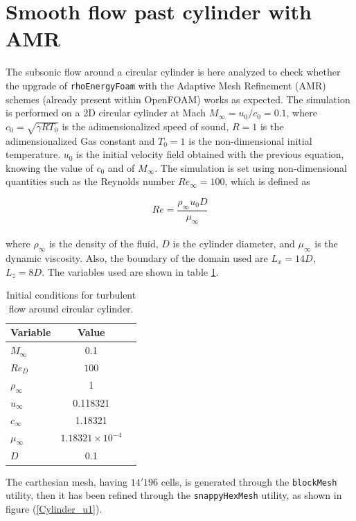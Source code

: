\documentclass[a5paper]{sapthesis}
\begin{document}
	\section{Smooth flow past cylinder with AMR}
	\label{AMR_cylinder}
	
	The subsonic flow around a circular cylinder is here analyzed to check whether the upgrade of \texttt{rhoEnergyFoam} with the Adaptive Mesh Refinement (AMR) schemes (already present within OpenFOAM) works as expected. The simulation is performed on a 2D  circular cylinder at Mach $M_\infty = u_0/c_0 = 0.1$, where $c_0 = \sqrt{\gamma R T_0}$ is the adimensionalized speed of sound, $R = 1$ is the adimensionalized Gas constant and $T_0 =1$ is the non-dimensional initial temperature. $u_0$ is the initial velocity field obtained with the previous equation, knowing the value of $c_0$ and of $M_\infty$. The simulation is set using non-dimensional quantities such as the Reynolds number $Re_\infty = 100$, which is defined as 
	
	\begin{equation}
		Re = \frac{\rho_\infty u_0 D}{\mu_\infty}
	\end{equation}
	\\
	where $\rho_\infty$ is the density of the fluid, $D$ is the cylinder diameter, and $\mu_\infty$ is the dynamic viscosity. Also, the boundary of the domain used are $L_x = 14D$, $L_z = 8D$. 
	The variables used are shown in table \ref{tab:cylinder_2d}.
	
	\begin{table}[h]
		\centering
		\begin{tabular}{lcc}
			\hline
			Variable & Value \\
			\hline
			$M_{\infty}$ & 0.1 \\
			$Re_{D}$ & $100$ \\
			$\rho_{\infty}$ & 1 \\
			$u_{\infty}$ & 0.118321 \\
			$c_{\infty}$ & 1.18321 \\
			$\mu_{\infty}$ & $1.18321 \times 10^{-4}$ \\
			$D$ & 0.1 \\
			\hline
		\end{tabular}
		\vspace{3mm}
		\caption{Initial conditions for turbulent flow around 
			circular cylinder.}
		\label{tab:cylinder_2d}
	\end{table}
	
	\noindent The carthesian mesh, having $14'196$ cells, is generated through the \texttt{blockMesh} utility, then it has been refined through the \texttt{snappyHexMesh} utility, as shown in figure (\ref{Cylinder_u1}). 
	
\end{document}
